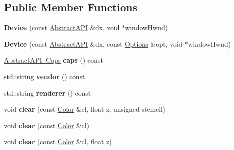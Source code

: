 \subsection*{Public Member Functions}
\begin{DoxyCompactItemize}
\item 
\hypertarget{class_tempest_1_1_device_a2f71142cdb05f90ddcc705262b7853ba}{{\bfseries Device} (const \hyperlink{class_tempest_1_1_abstract_a_p_i}{Abstract\+A\+P\+I} \&dx, void $\ast$window\+Hwnd)}\label{class_tempest_1_1_device_a2f71142cdb05f90ddcc705262b7853ba}

\item 
\hypertarget{class_tempest_1_1_device_a2709546b08ff48e50c5a3ae6dc84308a}{{\bfseries Device} (const \hyperlink{class_tempest_1_1_abstract_a_p_i}{Abstract\+A\+P\+I} \&dx, const \hyperlink{struct_tempest_1_1_abstract_a_p_i_1_1_options}{Options} \&opt, void $\ast$window\+Hwnd)}\label{class_tempest_1_1_device_a2709546b08ff48e50c5a3ae6dc84308a}

\item 
\hypertarget{class_tempest_1_1_device_aa4c0bc85221954bd84f62b420b2e9326}{\hyperlink{struct_tempest_1_1_abstract_a_p_i_1_1_caps}{Abstract\+A\+P\+I\+::\+Caps} {\bfseries caps} () const }\label{class_tempest_1_1_device_aa4c0bc85221954bd84f62b420b2e9326}

\item 
\hypertarget{class_tempest_1_1_device_a413ed4348a1a6846b5852af64c4626fd}{std\+::string {\bfseries vendor} () const }\label{class_tempest_1_1_device_a413ed4348a1a6846b5852af64c4626fd}

\item 
\hypertarget{class_tempest_1_1_device_a31cda3d2c2639720f19175e4197cda0e}{std\+::string {\bfseries renderer} () const }\label{class_tempest_1_1_device_a31cda3d2c2639720f19175e4197cda0e}

\item 
\hypertarget{class_tempest_1_1_device_ab033cd1a73882f272c8cf433a62da404}{void {\bfseries clear} (const \hyperlink{class_tempest_1_1_color}{Color} \&cl, float z, unsigned stemcil)}\label{class_tempest_1_1_device_ab033cd1a73882f272c8cf433a62da404}

\item 
\hypertarget{class_tempest_1_1_device_ae5fce03158df69bbdf6a416a8ebffd6e}{void {\bfseries clear} (const \hyperlink{class_tempest_1_1_color}{Color} \&cl)}\label{class_tempest_1_1_device_ae5fce03158df69bbdf6a416a8ebffd6e}

\item 
\hypertarget{class_tempest_1_1_device_a8dc365332657170459c8e1742d1745b3}{void {\bfseries clear} (const \hyperlink{class_tempest_1_1_color}{Color} \&cl, float z)}\label{class_tempest_1_1_device_a8dc365332657170459c8e1742d1745b3}


\end{DoxyCompactItemize}
